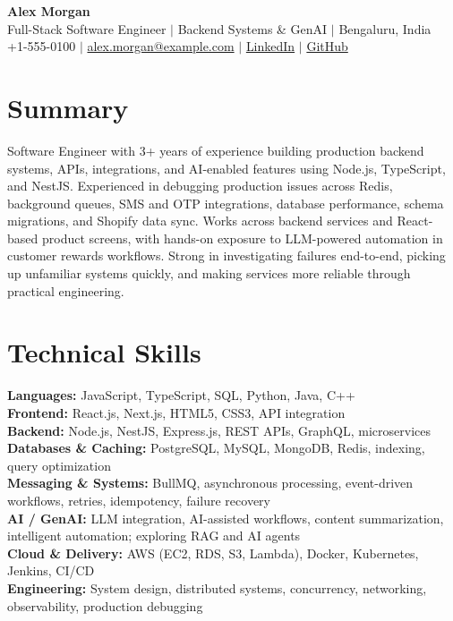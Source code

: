 \documentclass[letterpaper,10pt]{article}
\begin{document}
\begin{center}
{\Huge \textbf{Alex Morgan}}\\ \vspace{3pt}
\small Full-Stack Software Engineer $|$ Backend Systems \& GenAI $|$ Bengaluru, India\\
\small +1-555-0100 $|$ \href{mailto:alex.morgan@example.com}{alex.morgan@example.com} $|$
\href{https://linkedin.com/in/alex-morgan-example/}{LinkedIn} $|$
\href{https://github.com/alex-morgan-example}{GitHub}
\end{center}

\section{Summary}
\small{Software Engineer with 3+ years of experience building production backend systems, APIs, integrations, and AI-enabled features using Node.js, TypeScript, and NestJS. Experienced in debugging production issues across Redis, background queues, SMS and OTP integrations, database performance, schema migrations, and Shopify data sync. Works across backend services and React-based product screens, with hands-on exposure to LLM-powered automation in customer rewards workflows. Strong in investigating failures end-to-end, picking up unfamiliar systems quickly, and making services more reliable through practical engineering.}

\section{Technical Skills}
\begin{itemize}[leftmargin=.15in,label={}]
\small{\item{
\textbf{Languages:} JavaScript, TypeScript, SQL, Python, Java, C++\\
\textbf{Frontend:} React.js, Next.js, HTML5, CSS3, API integration\\
\textbf{Backend:} Node.js, NestJS, Express.js, REST APIs, GraphQL, microservices\\
\textbf{Databases \& Caching:} PostgreSQL, MySQL, MongoDB, Redis, indexing, query optimization\\
\textbf{Messaging \& Systems:} BullMQ, asynchronous processing, event-driven workflows, retries, idempotency, failure recovery\\
\textbf{AI / GenAI:} LLM integration, AI-assisted workflows, content summarization, intelligent automation; exploring RAG and AI agents\\
\textbf{Cloud \& Delivery:} AWS (EC2, RDS, S3, Lambda), Docker, Kubernetes, Jenkins, CI/CD\\
\textbf{Engineering:} System design, distributed systems, concurrency, networking, observability, production debugging
}}
\end{itemize}
\end{document}
